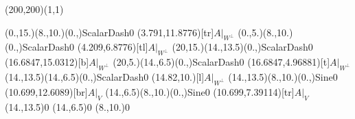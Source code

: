 \unitlength=1bp%

\begin{feynartspicture}(200,200)(1,1)

\FADiagram{}
\FAProp(0.,15.)(8.,10.)(0.,){ScalarDash}{0}
\FALabel(3.791,11.8776)[tr]{$A|_{W^\perp}$}
\FAProp(0.,5.)(8.,10.)(0.,){ScalarDash}{0}
\FALabel(4.209,6.8776)[tl]{$A|_{W^\perp}$}
\FAProp(20,15.)(14.,13.5)(0.,){ScalarDash}{0}
\FALabel(16.6847,15.0312)[b]{$A|_{W^\perp}$}
\FAProp(20,5.)(14.,6.5)(0.,){ScalarDash}{0}
\FALabel(16.6847,4.96881)[t]{$A|_{W^\perp}$}
\FAProp(14.,13.5)(14.,6.5)(0.,){ScalarDash}{0}
\FALabel(14.82,10.)[l]{$A|_{W^\perp}$}
\FAProp(14.,13.5)(8.,10.)(0.,){Sine}{0}
\FALabel(10.699,12.6089)[br]{$A|_V$}
\FAProp(14.,6.5)(8.,10.)(0.,){Sine}{0}
\FALabel(10.699,7.39114)[tr]{$A|_V$}
\FAVert(14.,13.5){0}
\FAVert(14.,6.5){0}
\FAVert(8.,10.){0}
\end{feynartspicture}

